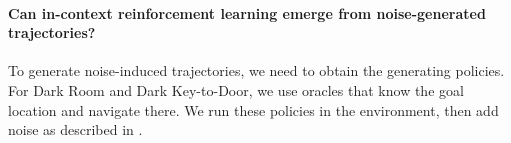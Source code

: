 \documentclass{article}
\theoremstyle{plain}
\theoremstyle{definition}
\theoremstyle{remark}
\begin{document}






\paragraph{Can in-context reinforcement learning emerge from noise-generated trajectories?}
\label{para:optimal_exp}
To generate noise-induced trajectories, we need to obtain the generating policies. For Dark Room and Dark Key-to-Door, we use oracles that know the goal location and navigate there. We run these policies in the environment, then add noise as described in .
\end{document}
